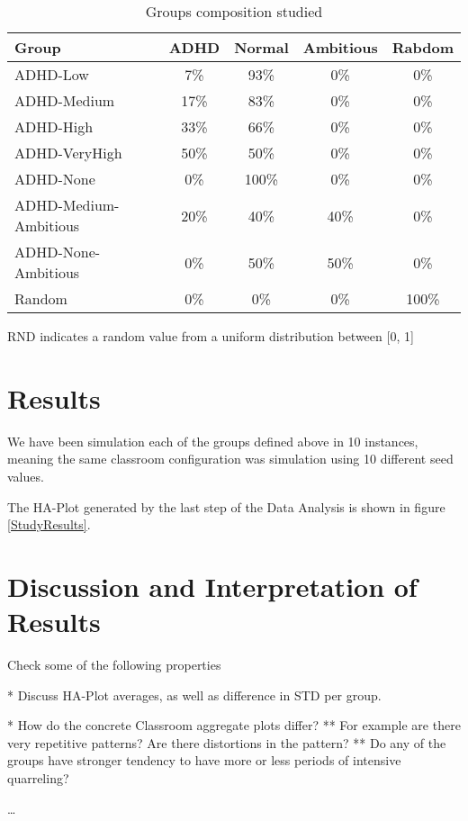 \begin{table}[h!]
    \centering
    \begin{tabular}{|l|c|c|c|c|} 
        \hline
        \textbf{Group} & \textbf{ADHD} & \textbf{Normal} & \textbf{Ambitious} &  \textbf{Rabdom} \\
        \hline
        \hline
        ADHD-Low & 7\% & 93\% & 0\% & 0\% \\
        \hline
        ADHD-Medium & 17\% & 83\% & 0\% & 0\% \\
        \hline
        ADHD-High & 33\% & 66\% & 0\% & 0\% \\
        \hline
        ADHD-VeryHigh & 50\% & 50\% & 0\% & 0\% \\
        \hline
        ADHD-None & 0\% & 100\% & 0\% & 0\% \\
        \hline
        ADHD-Medium-Ambitious & 20\% & 40\% & 40\% & 0\%\\
        \hline
        ADHD-None-Ambitious & 0\% & 50\% & 50\% & 0\% \\
        \hline
        Random & 0\% & 0\% & 0\% & 100\% \\
        \hline
    \end{tabular}
    \caption{Groups composition studied}
    \small RND indicates a random value from a uniform distribution between [0, 1]
    \label{GroupTable}
\end{table}

\section{Results}
We have been simulation each of the groups defined above in 10 instances, meaning 
the same classroom configuration was simulation using 10 different seed values.

The HA-Plot generated by the last step of the Data Analysis is shown in figure \ref{StudyResults}.

\begin{figure}[]
\end{figure}

\section{Discussion and Interpretation of Results}
Check some of the following properties

* Discuss HA-Plot averages, as well as difference in STD per group.

* How do the concrete Classroom aggregate plots differ?
    ** For example are there very repetitive patterns? Are there distortions in the pattern?
    ** Do any of the groups have stronger tendency to have more or less periods of intensive quarreling?

\dots


